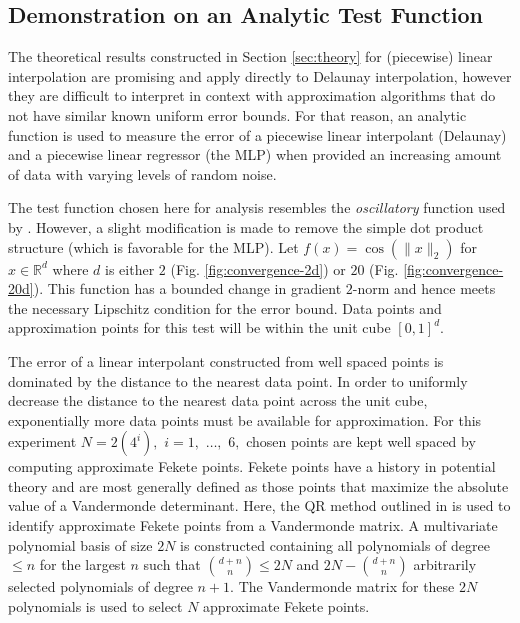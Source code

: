 \documentclass[smallextended,final]{svjour3}  %
\begin{document}
\vspace{-2mm}
\subsection{Demonstration on an Analytic Test Function}
\label{sec:analytic}

The theoretical results constructed in Section \ref{sec:theory} for
(piecewise) linear interpolation are promising and apply directly to
Delaunay interpolation, however they are difficult to interpret in
context with approximation algorithms that do not have similar known
uniform error bounds. For that reason, an analytic function is used to
measure the error of a piecewise linear interpolant (Delaunay) and a
piecewise linear regressor (the MLP) when provided an increasing
amount of data with varying levels of random noise.

The test function chosen here for analysis resembles the
\textit{oscillatory} function used by \cite{barthelmann2000high}.
However, a slight modification is made to remove the simple dot
product structure (which is favorable for the MLP). Let $f(x)
=\cos(\|x\|_2)$ for $x \in \mathbb{R}^d$ where $d$ is either $2$
(Fig. \ref{fig:convergence-2d}) or $20$
(Fig. \ref{fig:convergence-20d}). This function has a bounded change
in gradient $2$-norm and hence meets the necessary Lipschitz condition
for the error bound. Data points and approximation points for this
test will be within the unit cube $[0,1]^d$.

The error of a linear interpolant constructed from well spaced points
is dominated by the distance to the nearest data point. In order to
uniformly decrease the distance to the nearest data point across the
unit cube, exponentially more data points must be available for
approximation. For this experiment $N = 2(4^i),$ $i = 1,$ $\ldots,$
$6,$ chosen points are kept well spaced by computing approximate
Fekete points. Fekete points have a history in potential theory
\cite{kovari_pommerenke_1968} and are most generally defined as those
points that maximize the absolute value of a Vandermonde
determinant. Here, the QR method outlined in \cite{bos2010computing}
is used to identify approximate Fekete points from a Vandermonde
matrix. A multivariate polynomial basis of size $2N$ is constructed
containing all polynomials of degree $\leq n$ for the largest $n$ such
that ${d+n \choose n} \leq 2N$ and $2N - {d+n \choose n}$
arbitrarily selected polynomials of degree $n + 1.$ The Vandermonde
matrix for these $2N$ polynomials is used to select $N$ approximate
Fekete points.
\end{document}
